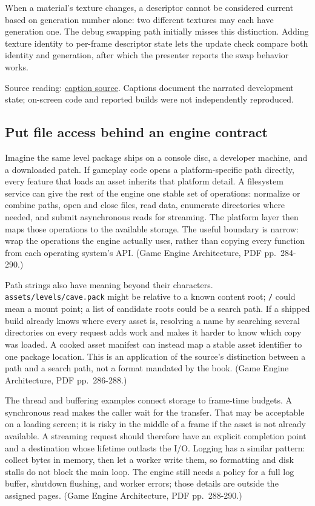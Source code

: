 When a material's texture changes, a descriptor cannot be considered current based on generation number alone: two different textures may each have generation one. The debug swapping path initially misses this distinction. Adding texture identity to per-frame descriptor state lets the update check compare both identity and generation, after which the presenter reports the swap behavior works.

Source reading: \href{https://www.youtube.com/watch?v=hDpzfAdW3vw}{caption source}. Captions document the narrated development state; on-screen code and reported builds were not independently reproduced.

\subsection{Put file access behind an engine contract}\label{06-engine-ii-ch027-put-file-access-behind-an-engine-contract}

Imagine the same level package ships on a console disc, a developer machine, and a downloaded patch. If gameplay code opens a platform-specific path directly, every feature that loads an asset inherits that platform detail. A filesystem service can give the rest of the engine one stable set of operations: normalize or combine paths, open and close files, read data, enumerate directories where needed, and submit asynchronous reads for streaming. The platform layer then maps those operations to the available storage. The useful boundary is narrow: wrap the operations the engine actually uses, rather than copying every function from each operating system's API. (Game Engine Architecture, PDF pp.~284-290.)

Path strings also have meaning beyond their characters. \texttt{assets/levels/cave.pack} might be relative to a known content root; \texttt{/} could mean a mount point; a list of candidate roots could be a search path. If a shipped build already knows where every asset is, resolving a name by searching several directories on every request adds work and makes it harder to know which copy was loaded. A cooked asset manifest can instead map a stable asset identifier to one package location. This is an application of the source's distinction between a path and a search path, not a format mandated by the book. (Game Engine Architecture, PDF pp.~286-288.)

The thread and buffering examples connect storage to frame-time budgets. A synchronous read makes the caller wait for the transfer. That may be acceptable on a loading screen; it is risky in the middle of a frame if the asset is not already available. A streaming request should therefore have an explicit completion point and a destination whose lifetime outlasts the I/O. Logging has a similar pattern: collect bytes in memory, then let a worker write them, so formatting and disk stalls do not block the main loop. The engine still needs a policy for a full log buffer, shutdown flushing, and worker errors; those details are outside the assigned pages. (Game Engine Architecture, PDF pp.~288-290.)

